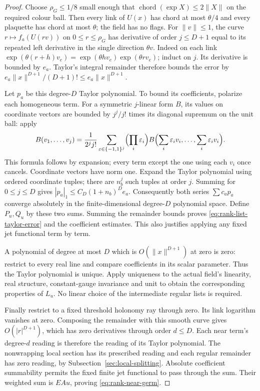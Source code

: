 \begin{proof}
Choose $\rho_G\le1/8$ small enough that
$\operatorname{chord}(\exp X)\le2\|X\|$ on the required colour
ball. Then every link of $U(x)$ has chord at most $\theta/4$ and
every plaquette has chord at most $\theta$; the field has no flags.
For $\|v\|\le1$, the curve $r\mapsto f_a(U(rv))$ on
$0\le r\le\rho_G$ has derivative of order $j\le D+1$ equal to
its repeated left derivative in the single direction $\theta v$.
Indeed on each link
$\exp(\theta(r+h)v_e)=\exp(\theta h v_e)\exp(\theta r v_e)$;
induct on $j$. Its derivative is bounded by $e_a$. Taylor's integral
remainder therefore bounds the error by
$e_a\|x\|^{D+1}/(D+1)!\le e_a\|x\|^{D+1}$.

Let $p_a$ be this degree-$D$ Taylor polynomial. To bound its
coefficients, polarize each homogeneous term. For a symmetric
$j$-linear form $B$, its values on coordinate vectors are bounded
by $j^j/j!$ times its diagonal supremum on the unit ball: apply
\[
 B(v_1,\ldots,v_j)=\frac1{2^j j!}
   \sum_{\varepsilon\in\{-1,1\}^j}
        \Bigl(\prod_i\varepsilon_i\Bigr)
        B\Bigl(\sum_i\varepsilon_i v_i,\ldots,
               \sum_i\varepsilon_i v_i\Bigr).
\]
This formula follows by expansion; every term except the one using
each $v_i$ once cancels. Coordinate vectors have norm one. Expand
the Taylor polynomial using ordered coordinate tuples; there are
$n_b^j$ such tuples at order $j$. Summing for $0\le j\le D$ gives
$|p_a|_1\le C_D(1+n_b)^D e_a$.
Consequently both series $\sum c_a p_a$ converge absolutely in the
finite-dimensional degree-$D$ polynomial space. Define $P_u,Q_u$
by these two sums. Summing the remainder bounds proves
\eqref{eq:rank-list-taylor-error} and the coefficient estimates.
This also justifies applying any fixed jet functional term by term.

A polynomial of degree at most $D$ which is
$O(\|x\|^{D+1})$ at zero is zero: restrict to every real line
and compare coefficients in its scalar parameter. Thus the Taylor
polynomial is unique. Apply uniqueness to the actual field's
linearity, real structure, constant-gauge invariance and unit to
obtain the corresponding properties of $L_u$. No linear choice of
the intermediate regular lists is required.

Finally restrict to a fixed threshold holonomy ray through zero.
Its link logarithm vanishes at zero. Composing the remainder with
this smooth curve gives $O(|r|^{D+1})$, which has zero derivatives
through order $d\le D$. Each near term's degree-$d$ reading is
therefore the reading of its Taylor polynomial. The nonwrapping
local section has its prescribed reading and each regular remainder
has zero reading, by Subsection~\ref{sec:local-splitting}. Absolute
coefficient summability permits the fixed finite jet functional to
pass through the sum. Their weighted sum is $EAu$, proving
\eqref{eq:rank-near-germ}.
\end{proof}

